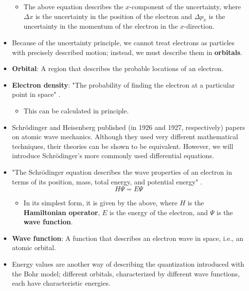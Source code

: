 \documentclass[../main.tex]{subfiles}
\begin{document}
\begin{itemize}
    \begin{itemize}
        \item The above equation describes the $x$-component of the uncertainty, where $\Delta x$ is the uncertainty in the position of the electron and $\Delta p_x$ is the uncertainty in the momentum of the electron in the $x$-direction.
    \end{itemize}
    \item Because of the uncertainty principle, we cannot treat electrons as particles with precisely described motion; instead, we must describe them in \textbf{orbitals}.
    \item \textbf{Orbital}: A region that describes the probable locations of an electron.
    \item \textbf{Electron density}: "The probability of finding the electron at a particular point in space" \parencite[14]{bib:MiesslerFischerTarr}.
    \begin{itemize}
        \item This can be calculated in principle.
    \end{itemize}
    \item Schr\"{o}dinger and Heisenberg published (in 1926 and 1927, respectively) papers on atomic wave mechanics. Although they used very different mathematical techniques, their theories can be shown to be equivalent. However, we will introduce Schr\"{o}dinger's more commonly used differential equations.
    \item "The Schr\"{o}dinger equation describes the wave properties of an electron in terms of its position, mass, total energy, and potential energy" \parencite[14]{bib:MiesslerFischerTarr}.
    \begin{equation*}
        H\Psi = E\Psi
    \end{equation*}
    \begin{itemize}
        \item In its simplest form, it is given by the above, where $H$ is the \textbf{Hamiltonian operator}, $E$ is the energy of the electron, and $\Psi$ is the \textbf{wave function}.
    \end{itemize}
    \item \textbf{Wave function}: A function that describes an electron wave in space, i.e., an atomic orbital.
    \item Energy values are another way of describing the quantization introduced with the Bohr model; different orbitals, characterized by different wave functions, each have characteristic energies.

\end{itemize}
\end{document}
